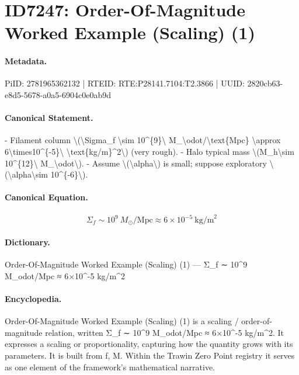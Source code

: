 \section*{ID7247: Order-Of-Magnitude Worked Example (Scaling) (1)}
\paragraph{Metadata.}
PiID: 2781965362132 | RTEID: RTE:P28141.7104:T2.3866 | UUID: 2820cb63-e8d5-5678-a0a5-6904c0e0ab9d

\paragraph{Canonical Statement.}
- Filament column \textbackslash{}(\textbackslash{}Sigma\_f \textbackslash{}sim 10\textasciicircum{}\{9\}\textbackslash{} M\_\textbackslash{}odot/\textbackslash{}text\{Mpc\} \textbackslash{}approx 6\textbackslash{}times10\textasciicircum{}\{-5\}\textbackslash{} \textbackslash{}text\{kg/m\}\textasciicircum{}2\textbackslash{}) (very rough). - Halo typical mass \textbackslash{}(M\_h\textbackslash{}sim 10\textasciicircum{}\{12\}\textbackslash{} M\_\textbackslash{}odot\textbackslash{}). - Assume \textbackslash{}(\textbackslash{}alpha\textbackslash{}) is small; suppose exploratory \textbackslash{}(\textbackslash{}alpha\textbackslash{}sim 10\textasciicircum{}\{-6\}\textbackslash{}).

\paragraph{Canonical Equation.}
\[
\Sigma_f \sim 10^{9}\ M_\odot/\text{Mpc} \approx 6\times10^{-5}\ \text{kg/m}^2
\]

\paragraph{Dictionary.}
Order-Of-Magnitude Worked Example (Scaling) (1) — Σ\_f ∼ 10\textasciicircum{}9 M\_odot/Mpc ≈ 6×10\textasciicircum{}-5 kg/m\textasciicircum{}2

\paragraph{Encyclopedia.}
Order-Of-Magnitude Worked Example (Scaling) (1) is a scaling / order-of-magnitude relation, written Σ\_f ∼ 10\textasciicircum{}9 M\_odot/Mpc ≈ 6×10\textasciicircum{}-5 kg/m\textasciicircum{}2. It expresses a scaling or proportionality, capturing how the quantity grows with its parameters. It is built from f, M. Within the Trawin Zero Point registry it serves as one element of the framework's mathematical narrative.
